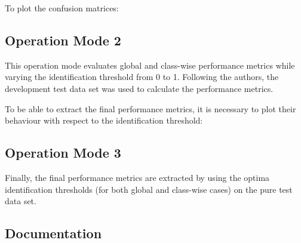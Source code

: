 \documentclass[letterpaper,10pt,english]{sphinxmanual}
\begin{document}
To plot the confusion matrices:

%
\begin{sphinxVerbatim}[commandchars=\\\{\}]
 
 
\end{sphinxVerbatim}


\subsection{Operation Mode 2}
\label{\detokenize{evaluate:operation-mode-2}}
This operation mode evaluates global and class-wise performance metrics while varying the
identification threshold from 0 to 1. Following the authors, the development test data set
was used to calculate the performance metrics.

To be able to extract the final performance metrics, it is necessary to plot their behaviour
with respect to the identification threshold:

%
\begin{sphinxVerbatim}[commandchars=\\\{\}]
 
 
\end{sphinxVerbatim}



\subsection{Operation Mode 3}
\label{\detokenize{evaluate:operation-mode-3}}
Finally, the final performance metrics are extracted by using the optima identification thresholds
(for both global and class-wise cases) on the pure test data set.


\subsection{Documentation}
\label{\detokenize{evaluate:documentation}}\label{\detokenize{evaluate:module-evaluate}}
\end{document}
